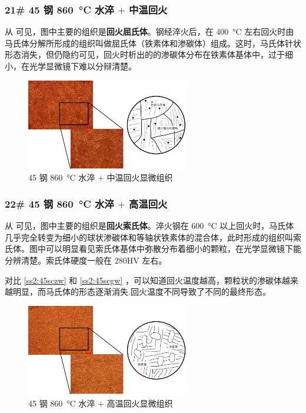 \documentclass[a4paper,utf8]{article}
\begin{document}
        \subsubsection{21# 45 钢 \SI{860}{\degreeCelsius} 水淬 $+$ 中温回火\label{ss2:45sczw}}
            从 可见，图中主要的组织是\textbf{回火屈氏体}。钢经淬火后，在 \SI{400}{\degreeCelsius} 左右回火时由马氏体分解所形成的组织叫做屈氏体（铁素体和渗碳体）组成。这时，马氏体针状形态消失，但仍隐约可见，回火时析出的的渗碳体分布在铁素体基体中，过于细小，在光学显微镜下难以分辩清楚。
            \begin{figure}[!ht]
                \includegraphics[height=40mm]{result/8.pdf}
                \caption{45 钢 \SI{860}{\degreeCelsius} 水淬 $+$ 中温回火显微组织\label{fig:8}}
            \end{figure}

        \subsubsection{22# 45 钢 \SI{860}{\degreeCelsius} 水淬 $+$ 高温回火\label{ss2:45scgw}}
            从 可见，图中主要的组织是\textbf{回火索氏体}。淬火钢在 \SI{600}{\degreeCelsius} 以上回火时，马氏体几乎完全转变为细小的球状渗碳体和等轴状铁素体的混合体，此时形成的组织叫索氏体。图中可以明显看见索氏体基体中弥散分布着细小的颗粒，在光学显微镜下能分辨清楚。索氏体硬度一般在 280HV 左右。\par
            对比 \ref{ss2:45sczw} 和 \ref{ss2:45scgw} ，可以知道回火温度越高，颗粒状的渗碳体越来越明显，而马氏体的形态逐渐消失.回火温度不同导致了不同的最终形态。
            \begin{figure}[!ht]
                \includegraphics[height=40mm]{result/9.pdf}
                \caption{45 钢 \SI{860}{\degreeCelsius} 水淬 $+$ 高温回火显微组织\label{fig:9}}
            \end{figure}
\end{document}
